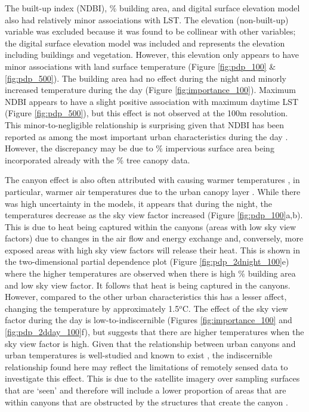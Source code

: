 \documentclass[final,3p,times,onecolumn,sort&compress]{elsarticle}
\begin{document}
The built-up index (NDBI), \% building area, and digital surface elevation model also had relatively minor associations with LST.
The elevation (non-built-up) variable was excluded because it was found to be collinear with other variables; the digital surface elevation model was included and represents the elevation including buildings and vegetation.
However, this elevation only appears to have minor associations with land surface temperature (Figure \ref{fig:pdp_100} \& \ref{fig:pdp_500}).
The building area had no effect during the night and minorly increased temperature during the day (Figure \ref{fig:importance_100}).
Maximum NDBI appears to have a slight positive association with maximum daytime LST (Figure \ref{fig:pdp_500}), but this effect is not observed at the 100m resolution.
This minor-to-negligible relationship is surprising given that NDBI has been reported as among the most important urban characteristics during the day \citep{Peng2018-cp}.
However, the discrepancy may be due to \% impervious surface area being incorporated already with the \% tree canopy data.

The canyon effect is also often attributed with causing warmer temperatures \citep{Chun2017-mm}, in particular, warmer air temperatures due to the urban canopy layer \cite{Oke1988-re}.
While there was high uncertainty in the models, it appears that during the night, the temperatures decrease as the sky view factor increased (Figure \ref{fig:pdp_100}a,b).
This is due to heat being captured within the canyons (areas with low sky view factors) due to changes in the air flow and energy exchange \cite{Oke1982-px} and, conversely, more exposed areas with high sky view factors will release their heat.
This is shown in the two-dimensional partial dependence plot (Figure \ref{fig:pdp_2dnight_100}e) where the higher temperatures are observed when there is high \% building area and low sky view factor.
It follows that heat is being captured in the canyons. 
However, compared to the other urban characteristics this has a lesser affect, changing the temperature by approximately 1.5$^o$C.
The effect of the sky view factor during the day is low-to-indiscernible (Figures \ref{fig:importance_100} and \ref{fig:pdp_2dday_100}f), but suggests that there are higher temperatures when the sky view factor is high.
Given that the relationship between urban canyons and urban temperatures is well-studied and known to exist \cite{Arnfield2003-gn}, the indiscernible relationship found here may reflect the limitations of remotely sensed data to investigate this effect.
This is due to the satellite imagery over sampling surfaces that are `seen' and therefore will include a lower proportion of areas that are within canyons that are obstructed by the structures that create the canyon \cite{Roth1989-jj}.
\end{document}
